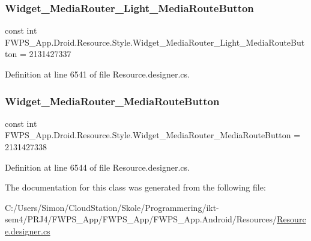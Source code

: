 \subsubsection{\texorpdfstring{Widget\+\_\+\+Media\+Router\+\_\+\+Light\+\_\+\+Media\+Route\+Button}{Widget\_MediaRouter\_Light\_MediaRouteButton}}
{\footnotesize\ttfamily const int F\+W\+P\+S\+\_\+\+App.\+Droid.\+Resource.\+Style.\+Widget\+\_\+\+Media\+Router\+\_\+\+Light\+\_\+\+Media\+Route\+Button = 2131427337}



Definition at line 6541 of file Resource.\+designer.\+cs.

\mbox{\label{class_f_w_p_s___app_1_1_droid_1_1_resource_1_1_style_aaa2ddce1421cf7877d7cbdd75444ae50}} 
\subsubsection{\texorpdfstring{Widget\+\_\+\+Media\+Router\+\_\+\+Media\+Route\+Button}{Widget\_MediaRouter\_MediaRouteButton}}
{\footnotesize\ttfamily const int F\+W\+P\+S\+\_\+\+App.\+Droid.\+Resource.\+Style.\+Widget\+\_\+\+Media\+Router\+\_\+\+Media\+Route\+Button = 2131427338}



Definition at line 6544 of file Resource.\+designer.\+cs.



The documentation for this class was generated from the following file\+:\begin{DoxyCompactItemize}
\item 
C\+:/\+Users/\+Simon/\+Cloud\+Station/\+Skole/\+Programmering/ikt-\/sem4/\+P\+R\+J4/\+F\+W\+P\+S\+\_\+\+App/\+F\+W\+P\+S\+\_\+\+App/\+F\+W\+P\+S\+\_\+\+App.\+Android/\+Resources/\mbox{\hyperlink{_resource_8designer_8cs}{Resource.\+designer.\+cs}}\end{DoxyCompactItemize}
